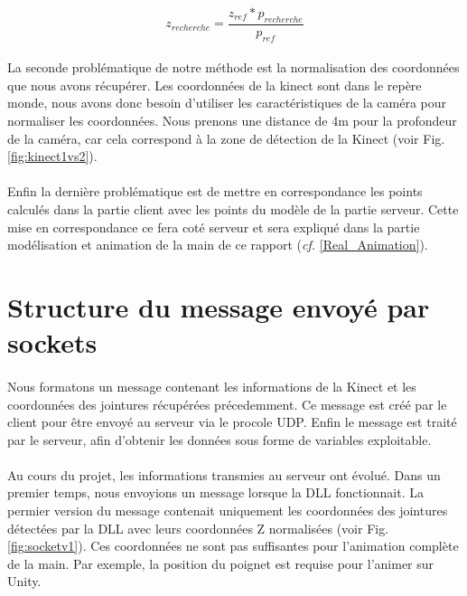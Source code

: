 \begin{equation}
 z_{recherche} = \frac{z_{ref} * p_{recherche}}{p_{ref}}
\end{equation}

\paragraph{}
La seconde problématique de notre méthode est la normalisation des coordonnées que nous avons récupérer. Les coordonnées
de la kinect sont dans le repère monde, nous avons donc besoin d'utiliser les caractéristiques de la caméra pour normaliser
les coordonnées. Nous prenons une distance de 4m pour la profondeur de la caméra, car cela correspond à la zone de détection de
la Kinect (voir Fig. \ref{fig:kinect1vs2}).

\paragraph{}
Enfin la dernière problématique est de mettre en correspondance les points calculés dans la partie client avec les points du modèle de la partie serveur. Cette mise en correspondance ce fera coté serveur et sera expliqué dans la partie \og modélisation et animation de la main \fg de ce rapport (\textit{cf.} \ref{Real_Animation}).


\section{Structure du message envoyé par sockets}
\paragraph{}
Nous formatons un message contenant les informations de la 
Kinect et les coordonnées des jointures récupérées précedemment. Ce 
message est créé par le client pour être envoyé au serveur via le 
procole UDP. Enfin le message est traité par le serveur, afin d'obtenir 
les données sous forme de variables exploitable.

\paragraph{}
Au cours du projet, les informations transmies au serveur ont évolué. 
Dans un premier temps, nous envoyions un message lorsque la DLL fonctionnait. 
La permier version du message contenait uniquement les coordonnées des 
jointures détectées par la DLL avec leurs coordonnées Z normalisées (voir Fig. \ref{fig:socketv1}).
Ces coordonnées ne sont pas suffisantes pour l'animation complète de la 
main. Par exemple, la position du poignet est requise pour l'animer 
sur Unity.

